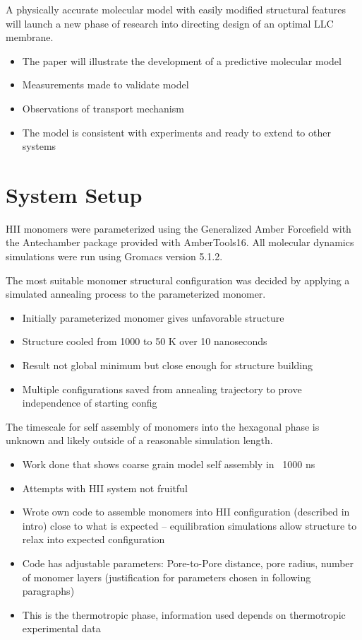 \documentclass{article}
\begin{document}
A physically accurate molecular model with easily modified structural features will launch a new phase of research into directing design of an optimal LLC membrane.
\begin{itemize}
	\item The paper will illustrate the development of a predictive molecular model
	\item Measurements made to validate model
	\item Observations of transport mechanism
	\item The model is consistent with experiments and ready to extend to other systems
\end{itemize}

\section{System Setup}

HII monomers were parameterized using the Generalized Amber Forcefield with the Antechamber package provided with AmberTools16. All molecular dynamics simulations were run using Gromacs version 5.1.2.

The most suitable monomer structural configuration was decided by applying a simulated annealing process to the parameterized monomer. 
\begin{itemize}
	\item Initially parameterized monomer gives unfavorable structure
	\item Structure cooled from 1000 to 50 K over 10 nanoseconds
	\item Result not global minimum but close enough for structure building
	\item Multiple configurations saved from annealing trajectory to prove independence of starting config
\end{itemize}

The timescale for self assembly of monomers into the hexagonal phase is unknown and likely outside of a reasonable simulation length. 
\begin{itemize}
	\item Work done that shows coarse grain model self assembly in ~1000 ns
	\item Attempts with HII system not fruitful
	\item Wrote own code to assemble monomers into HII configuration (described in intro) close to what is expected -- equilibration simulations allow structure to relax into expected configuration 
	\item Code has adjustable parameters: Pore-to-Pore distance, pore radius, number of monomer layers (justification for parameters chosen in following paragraphs)
	\item This is the thermotropic phase, information used depends on thermotropic experimental data
\end{itemize}
\end{document}
